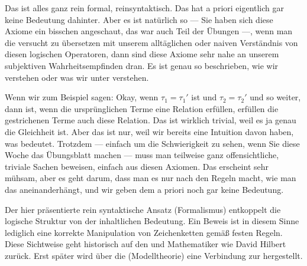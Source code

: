 \begin{spoken-clean}[00:09:00 - 00:11:15]
Das ist alles ganz rein formal, reinsyntaktisch. Das hat a priori eigentlich gar keine Bedeutung dahinter. Aber es ist natürlich so --- Sie haben sich diese Axiome ein bisschen angeschaut, das war auch Teil der Übungen ---, wenn man die versucht zu übersetzen mit unserem alltäglichen oder naiven Verständnis von diesen logischen Operatoren, dann sind diese Axiome sehr nahe an unserem subjektiven Wahrheitsempfinden dran. Es ist genau so beschrieben, wie wir  verstehen oder was wir unter  verstehen.

Wenn wir zum Beispiel sagen: Okay, wenn $\tau_1 = \tau_1'$ ist und $\tau_2 = \tau_2'$ und so weiter, dann ist, wenn die ursprünglichen Terme eine Relation erfüllen, erfüllen die gestrichenen Terme auch diese Relation. Das ist wirklich trivial, weil es ja genau die Gleichheit ist. Aber das ist nur, weil wir bereits eine Intuition davon haben, was  bedeutet. Trotzdem --- einfach um die Schwierigkeit zu sehen, wenn Sie diese Woche das Übungsblatt machen --- muss man teilweise ganz offensichtliche, triviale Sachen beweisen, einfach aus diesen Axiomen. Das erscheint sehr mühsam, aber es geht darum, dass man es nur nach den Regeln macht, wie man das aneinanderhängt, und wir geben dem a priori noch gar keine Bedeutung.
\end{spoken-clean}

\begin{didactic-insight}
Der hier präsentierte rein syntaktische Ansatz (Formalismus) entkoppelt die logische Struktur von der inhaltlichen Bedeutung. Ein Beweis ist in diesem Sinne lediglich eine korrekte Manipulation von Zeichenketten gemäß festen Regeln. Diese Sichtweise geht historisch auf den  und Mathematiker wie David Hilbert zurück. Erst später wird über die  (Modelltheorie) eine Verbindung zur  hergestellt.
\end{didactic-insight}

